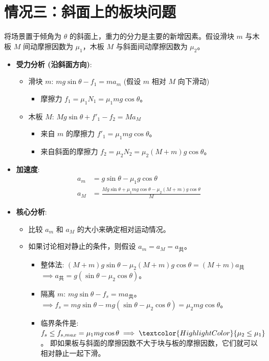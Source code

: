 \documentclass[a4paper,11pt]{ctexart}
\begin{document}
\section{情况三：斜面上的板块问题}
将场景置于倾角为 $\theta$ 的斜面上，重力的分力是主要的新增因素。假设滑块 $m$ 与木板 $M$ 间动摩擦因数为 $\mu_1$，木板 $M$ 与斜面间动摩擦因数为 $\mu_2$。
\begin{itemize}
    \item \textbf{受力分析 (沿斜面方向)}:
        \begin{itemize}
            \item 滑块 $m$: $mg\sin\theta - f_{1} = ma_m$ (假设 $m$ 相对 $M$ 向下滑动)
                \begin{itemize}
                    \item 摩擦力 $f_1 = \mu_1 N_1 = \mu_1 mg\cos\theta$。
                \end{itemize}
            \item 木板 $M$: $Mg\sin\theta + f'_{1} - f_2 = Ma_M$
                \begin{itemize}
                    \item 来自 $m$ 的摩擦力 $f'_1 = \mu_1 mg\cos\theta$。
                    \item 来自斜面的摩擦力 $f_2 = \mu_2 N_2 = \mu_2 (M+m)g\cos\theta$。
                \end{itemize}
        \end{itemize}
    \item \textbf{加速度}:
        \begin{align*}
            a_m &= g\sin\theta - \mu_1 g\cos\theta \\
            a_M &= \frac{Mg\sin\theta + \mu_1 mg\cos\theta - \mu_2 (M+m)g\cos\theta}{M}
        \end{align*}
    \item \textbf{核心分析}:
        \begin{itemize}
            \item 比较 $a_m$ 和 $a_M$ 的大小来确定相对运动情况。
            \item 如果讨论相对静止的条件，则假设 $a_m = a_M = a_{共}$。
                \begin{itemize}
                    \item 整体法: $(M+m)g\sin\theta - \mu_2 (M+m)g\cos\theta = (M+m)a_{共}$
                    $\implies a_{共} = g(\sin\theta - \mu_2 \cos\theta)$。
                    \item 隔离 $m$: $mg\sin\theta - f_s = ma_{共}$。
                    $\implies f_s = mg\sin\theta - m g(\sin\theta - \mu_2 \cos\theta) = \mu_2 mg\cos\theta$。
                    \item 临界条件是: $f_s \le f_{s,max} = \mu_1 mg\cos\theta \implies \textcolor{HighlightColor}{\mu_2 \le \mu_1}$。
                    即如果板与斜面的摩擦因数不大于块与板的摩擦因数，它们就可以相对静止一起下滑。
                \end{itemize}
        \end{itemize}
\end{itemize}
\end{document}
